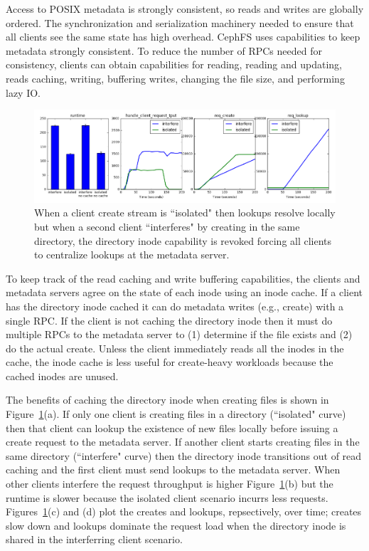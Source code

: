\documentclass[preprint]{sigplanconf-eurosys}
\begin{document}
Access to POSIX metadata is strongly consistent, so reads and writes are
globally ordered. The synchronization and serialization machinery needed to
ensure that all clients see the same state has high overhead.  CephFS uses
capabilities to keep metadata strongly consistent. To reduce the number of RPCs
needed for consistency, clients can obtain capabilities for reading, reading
and updating, reads caching, writing, buffering writes, changing the file size,
and performing lazy IO.

\begin{figure}[tb]%
\centering
\includegraphics[width=180mm]{figures/throughput-droplease.png}
\caption{When a client create stream is ``isolated" then lookups resolve
locally but when a second client ``interferes" by creating in the same directory,
the directory inode capability is revoked forcing all clients to centralize
lookups at the metadata server.  \label{fig:throughput-droplease}}
\end{figure}

To keep track of the read caching and write buffering capabilities, the clients
and metadata servers agree on the state of each inode using an inode cache.  If
a client has the directory inode cached it can do metadata writes (e.g.,
create) with a single RPC. If the client is not caching the directory inode
then it must do multiple RPCs to the metadata server to (1) determine if the
file exists and (2) do the actual create.  Unless the client immediately reads
all the inodes in the cache, the inode cache is less useful for create-heavy
workloads because the cached inodes are unused. 

The benefits of caching the directory inode when creating files is shown in
Figure~\ref{fig:throughput-droplease}(a).  If only one client is creating files
in a directory (``isolated" curve) then that client can lookup the existence of
new files locally before issuing a create request to the metadata server. If
another client starts creating files in the same directory (``interfere" curve)
then the directory inode transitions out of read caching and the first client
must send lookups to the metadata server. When other clients interfere the
request throughput is higher Figure~\ref{fig:throughput-droplease}(b) but the
runtime is slower because the isolated client scenario incurrs less requests.
Figures~\ref{fig:throughput-droplease}(c) and (d) plot the creates and lookups,
repsectively, over time; creates slow down and lookups dominate the request
load when the directory inode is shared in the interferring client scenario.
\end{document}

